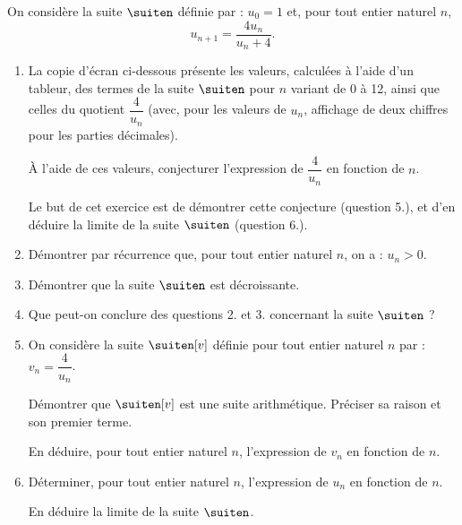 On considère la suite $\suiten$ définie par : $u_0 = 1$ et, pour tout entier naturel $n$, \[ u_{n+1}=\dfrac{4u_n}{u_n+4}. \]

\begin{enumerate}
	\item La copie d’écran ci-dessous présente les valeurs, calculées à l’aide d’un tableur, des
	termes de la suite $\suiten$ pour $n$ variant de 0 à 12, ainsi que celles du quotient $\dfrac{4}{u_n}$ (avec, pour les valeurs de $u_n$, affichage de deux chiffres pour les parties décimales).
	
	\begin{center}
	\end{center}
	
	\smallskip
	
	À l’aide de ces valeurs, conjecturer l’expression de $\dfrac{4}{u_n}$ en fonction de $n$.
	
	\smallskip
	
	Le but de cet exercice est de démontrer cette conjecture (question 5.), et d’en déduire la limite de la suite $\suiten$ (question 6.).
	\item Démontrer par récurrence que, pour tout entier naturel $n$, on a : $u_n > 0$.
	\item Démontrer que la suite $\suiten$ est décroissante.
	\item Que peut-on conclure des questions 2. et 3. concernant la suite $\suiten$ ?
	\item On considère la suite $\suiten[v]$ définie pour tout entier naturel $n$ par : $v_n = \dfrac{4}{u_n}$.
	
	Démontrer que $\suiten[v]$ est une suite arithmétique. Préciser sa raison et son premier terme.
	
	En déduire, pour tout entier naturel $n$, l’expression de $v_n$ en fonction de $n$.
	\item Déterminer, pour tout entier naturel $n$, l’expression de $u_n$ en fonction de $n$.
	
	En déduire la limite de la suite $\suiten$.
\end{enumerate}


